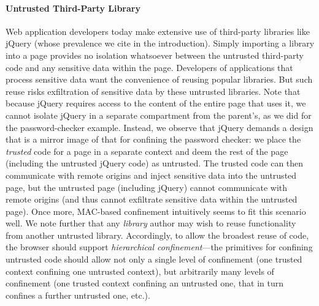 \paragraph{Untrusted Third-Party Library}
Web application developers today make extensive use of third-party
libraries like jQuery (whose prevalence we cite in the
introduction). Simply importing a library into a page provides no
isolation whatsoever between the untrusted third-party code and any
sensitive data within the page. Developers of applications that
process sensitive data want the convenience of reusing popular
libraries. But such reuse risks exfiltration of sensitive data by
these untrusted libraries. Note that because jQuery requires access to
the content of the entire page that uses it, we cannot isolate jQuery
in a separate compartment from the parent's, as we did for the
password-checker example. Instead, we observe that jQuery demands a
design that is a mirror image of that for confining the password
checker: we place the {\em trusted} code for a page in a separate
context and deem the rest of the page (including the untrusted jQuery
code) as untrusted. The trusted code can then communicate with remote
origins and inject sensitive data into the untrusted page, but the
untrusted page (including jQuery) cannot communicate with remote
origins (and thus cannot exfiltrate sensitive data within the
untrusted page). Once more, MAC-based confinement intuitively seems to
fit this scenario well. We note further that any {\em library} author
may wish to reuse functionality from another untrusted
library. Accordingly, to allow the broadest reuse of code, the browser
should support {\em hierarchical confinement}---the primitives for
confining untrusted code should allow not only a single level of
confinement (one trusted context confining one untrusted context), but
arbitrarily many levels of confinement (one trusted context confining
an untrusted one, that in turn confines a further untrusted one,
etc.).



